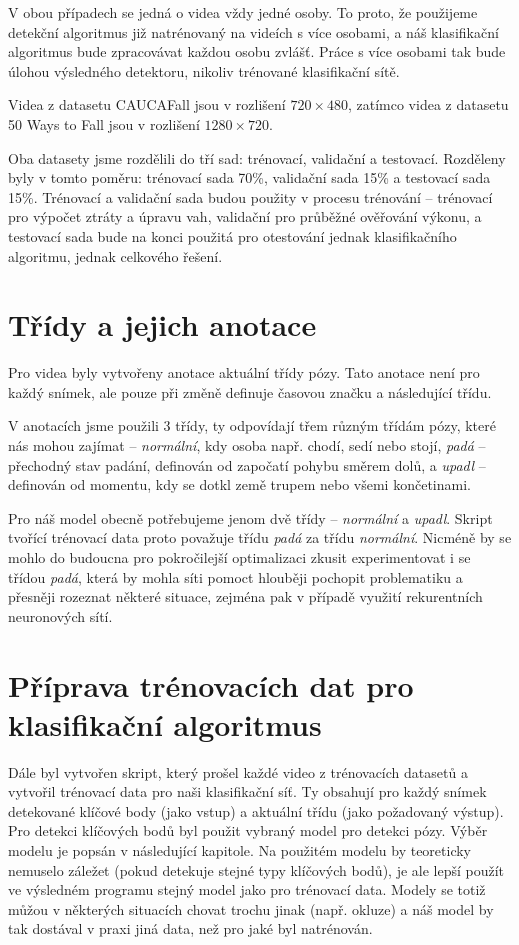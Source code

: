 V obou případech se jedná o videa vždy jedné osoby. To proto, že použijeme
detekční algoritmus již natrénovaný na videích s více osobami, a náš
klasifikační algoritmus bude zpracovávat každou osobu zvlášť. Práce s více
osobami tak bude úlohou výsledného detektoru, nikoliv trénované klasifikační
sítě.

Videa z datasetu CAUCAFall jsou v rozlišení $720\times480$, zatímco videa z
datasetu 50 Ways to Fall jsou v rozlišení $1280\times720$.

Oba datasety jsme rozdělili do tří sad: trénovací, validační a testovací.
Rozděleny byly v tomto poměru: trénovací sada 70\%, validační sada 15\% a
testovací sada 15\%. Trénovací a validační sada budou použity v procesu
trénování – trénovací pro výpočet ztráty a úpravu vah, validační pro průběžné
ověřování výkonu, a testovací sada bude na konci použitá pro otestování jednak
klasifikačního algoritmu, jednak celkového řešení.

\section{Třídy a jejich anotace}
Pro videa byly vytvořeny anotace aktuální třídy pózy. Tato anotace není pro
každý snímek, ale pouze při změně definuje časovou značku a následující třídu.

V anotacích jsme použili 3 třídy, ty odpovídají třem různým třídám pózy, které
nás mohou zajímat – \textit{normální}, kdy osoba např. chodí, sedí nebo stojí,
\textit{padá} – přechodný stav padání, definován od započatí pohybu směrem
dolů, a \textit{upadl} – definován od momentu, kdy se dotkl země trupem nebo
všemi končetinami.

Pro náš model obecně potřebujeme jenom dvě třídy – \textit{normální} a
\textit{upadl}. Skript tvořící trénovací data proto považuje třídu
\textit{padá} za třídu \textit{normální}. Nicméně by se mohlo do budoucna pro
pokročilejší optimalizaci zkusit experimentovat i se třídou \textit{padá},
která by mohla síti pomoct hlouběji pochopit problematiku a přesněji rozeznat
některé situace, zejména pak v případě využití rekurentních neuronových sítí.

\section{Příprava trénovacích dat pro klasifikační algoritmus}

Dále byl vytvořen skript, který prošel každé video z trénovacích datasetů a
vytvořil trénovací data pro naši klasifikační síť. Ty obsahují pro každý snímek
detekované klíčové body (jako vstup) a aktuální třídu (jako požadovaný výstup).
Pro detekci klíčových bodů byl použit vybraný model pro detekci pózy. Výběr
modelu je popsán v následující kapitole. Na použitém modelu by teoreticky
nemuselo záležet (pokud detekuje stejné typy klíčových bodů), je ale lepší
použít ve výsledném programu stejný model jako pro trénovací data. Modely se
totiž můžou v některých situacích chovat trochu jinak (např. okluze) a náš
model by tak dostával v praxi jiná data, než pro jaké byl natrénován.

